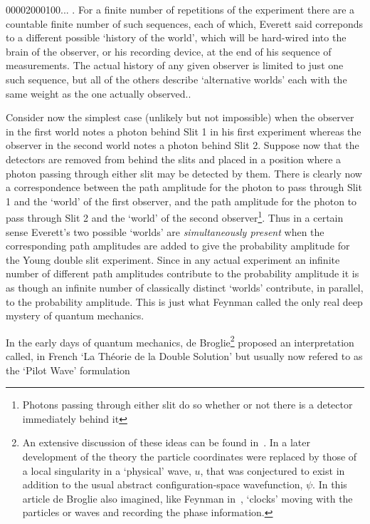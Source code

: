 {    00002000100... . For a finite number of repetitions of the experiment there are a
   countable finite number of such sequences, each of which, Everett said correponds to
   a different possible `history of the world', which will be hard-wired into the brain 
  of the observer, or his recording device, at the end of his sequence of measurements.
    The actual history of any given observer is limited to just one such sequence,
    but all of the others describe `alternative worlds' each with the same weight
    as the one actually observed..
   \par Consider now the simplest case (unlikely but not impossible) 
    when the observer in the first world notes a photon behind Slit 1 in his first
   experiment whereas the observer in the second world notes a photon behind Slit 2.
   Suppose now that the detectors are removed from behind the slits and placed in a
    position where a photon passing through either slit may be detected by them.
     There is clearly now a correspondence between the path amplitude for the photon
   to pass through Slit 1 and the `world' of the first observer, and the path
   amplitude for the photon to pass through Slit 2 and the `world' of the second
   observer\footnote{Photons passing through either slit do so whether or not there is 
   a detector immediately behind it}. Thus in a certain sense Everett's two possible
  `worlds' are {\it simultaneously present} when the corresponding path amplitudes are
   added to give the probability amplitude for the Young double slit experiment.
   Since in any actual experiment an infinite number of different path amplitudes
   contribute to the probability amplitude it is as though an infinite number
   of classically distinct `worlds' contribute, in parallel, to the probability
   amplitude. This is just what Feynman called the only real deep mystery of
   quantum mechanics.
   \par In the early days of quantum mechanics, de Broglie\footnote{An extensive discussion
   of these ideas can be found in~\cite{DeBroglie1}. In a later development
   of the theory the particle coordinates were replaced by those of a local singularity
    in a `physical' wave, $u$, that was conjectured to exist in addition to the usual
   abstract configuration-space wavefunction, $\psi$. In this article de Broglie also
  imagined, like Feynman in~\cite{Feyn1}, `clocks' moving with the particles or waves
  and recording the phase information.} proposed an interpretation called, in French `La Th\'{e}orie de la
   Double Solution' but usually now refered to as the `Pilot Wave' formulation
}
